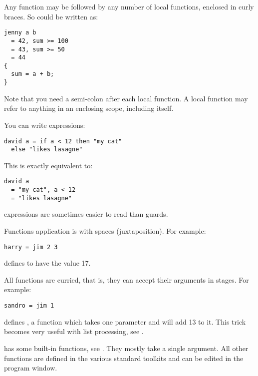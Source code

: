 Any function may be followed by any number of local functions, enclosed in
curly braces. So  could be written as:

\begin{verbatim}
jenny a b
  = 42, sum >= 100
  = 43, sum >= 50
  = 44
{
  sum = a + b;
}
\end{verbatim}

\noindent
Note that you need a semi-colon after each local function.  A local function
may refer to anything in an enclosing scope, including itself.

You can write  expressions:

\begin{verbatim}
david a = if a < 12 then "my cat"
  else "likes lasagne"
\end{verbatim}

\noindent
This is exactly equivalent to:

\begin{verbatim}
david a
  = "my cat", a < 12
  = "likes lasagne"
\end{verbatim}

\noindent
{} expressions are sometimes easier to read than guards.

Functions application is with spaces (juxtaposition). For example:

\begin{verbatim}
harry = jim 2 3
\end{verbatim}

\noindent
defines  to have the value 17. 

All functions are curried, that is, they can accept their arguments in
stages. For example:

\begin{verbatim}
sandro = jim 1
\end{verbatim}

\noindent
defines , a function which takes one parameter and will add 13 to
it. This trick becomes very useful with list processing, see .

\nip{} has some built-in functions, see . They mostly 
take a single argument. All other functions are defined in the various
standard toolkits and can be edited in the program window.

